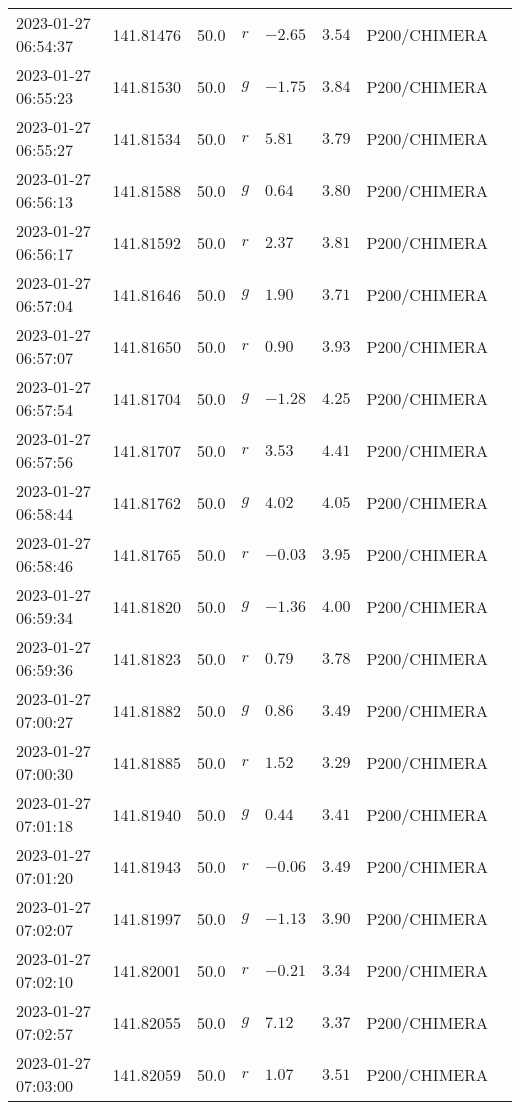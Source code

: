 \documentclass{nature_plusfigure}
\begin{document}
\begin{supplement}
\begin{center}
\begin{longtable}{llllllll}
2023-01-27 06:54:37 & 141.81476 & 50.0 & $r$ & $-2.65$ & $3.54$ & P200/CHIMERA &  \\ 
2023-01-27 06:55:23 & 141.81530 & 50.0 & $g$ & $-1.75$ & $3.84$ & P200/CHIMERA &  \\ 
2023-01-27 06:55:27 & 141.81534 & 50.0 & $r$ & $5.81$ & $3.79$ & P200/CHIMERA &  \\ 
2023-01-27 06:56:13 & 141.81588 & 50.0 & $g$ & $0.64$ & $3.80$ & P200/CHIMERA &  \\ 
2023-01-27 06:56:17 & 141.81592 & 50.0 & $r$ & $2.37$ & $3.81$ & P200/CHIMERA &  \\ 
2023-01-27 06:57:04 & 141.81646 & 50.0 & $g$ & $1.90$ & $3.71$ & P200/CHIMERA &  \\ 
2023-01-27 06:57:07 & 141.81650 & 50.0 & $r$ & $0.90$ & $3.93$ & P200/CHIMERA &  \\ 
2023-01-27 06:57:54 & 141.81704 & 50.0 & $g$ & $-1.28$ & $4.25$ & P200/CHIMERA &  \\ 
2023-01-27 06:57:56 & 141.81707 & 50.0 & $r$ & $3.53$ & $4.41$ & P200/CHIMERA &  \\ 
2023-01-27 06:58:44 & 141.81762 & 50.0 & $g$ & $4.02$ & $4.05$ & P200/CHIMERA &  \\ 
2023-01-27 06:58:46 & 141.81765 & 50.0 & $r$ & $-0.03$ & $3.95$ & P200/CHIMERA &  \\ 
2023-01-27 06:59:34 & 141.81820 & 50.0 & $g$ & $-1.36$ & $4.00$ & P200/CHIMERA &  \\ 
2023-01-27 06:59:36 & 141.81823 & 50.0 & $r$ & $0.79$ & $3.78$ & P200/CHIMERA &  \\ 
2023-01-27 07:00:27 & 141.81882 & 50.0 & $g$ & $0.86$ & $3.49$ & P200/CHIMERA &  \\ 
2023-01-27 07:00:30 & 141.81885 & 50.0 & $r$ & $1.52$ & $3.29$ & P200/CHIMERA &  \\ 
2023-01-27 07:01:18 & 141.81940 & 50.0 & $g$ & $0.44$ & $3.41$ & P200/CHIMERA &  \\ 
2023-01-27 07:01:20 & 141.81943 & 50.0 & $r$ & $-0.06$ & $3.49$ & P200/CHIMERA &  \\ 
2023-01-27 07:02:07 & 141.81997 & 50.0 & $g$ & $-1.13$ & $3.90$ & P200/CHIMERA &  \\ 
2023-01-27 07:02:10 & 141.82001 & 50.0 & $r$ & $-0.21$ & $3.34$ & P200/CHIMERA &  \\ 
2023-01-27 07:02:57 & 141.82055 & 50.0 & $g$ & $7.12$ & $3.37$ & P200/CHIMERA &  \\ 
2023-01-27 07:03:00 & 141.82059 & 50.0 & $r$ & $1.07$ & $3.51$ & P200/CHIMERA &  \\ 

\end{longtable}
\end{center}
\end{supplement}
\end{document}
